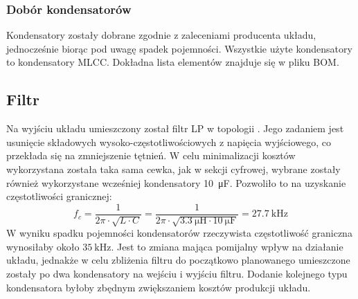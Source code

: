 \documentclass{article}
\begin{document}
\subsubsection{Dobór kondensatorów}
Kondensatory zostały dobrane zgodnie z zaleceniami producenta układu, jednocześnie biorąc pod uwagę spadek pojemności. Wszystkie użyte kondensatory to kondensatory MLCC. Dokładna lista elementów znajduje się w pliku BOM.

\subsection{Filtr}
Na wyjściu układu umieszczony został filtr LP w topologii \Pi. Jego zadaniem jest usunięcie składowych wysoko-częstotliwościowych z napięcia wyjściowego, co przekłada się na zmniejszenie tętnień. W celu minimalizacji kosztów wykorzystana została taka sama cewka, jak w sekcji cyfrowej, wybrane zostały również wykorzystane wcześniej kondensatory \SI{10}{\micro\farad}. Pozwoliło to na uzyskanie częstotliwości granicznej: $$f_c = \frac{1}{2\pi \cdot \sqrt{L \cdot C}} = \frac{1}{2\pi \cdot \sqrt{\SI{3.3}{\micro\henry} \cdot \SI{10}{\micro\farad}}} = \SI{27.7}{\kilo\hertz}$$
W wyniku spadku pojemności kondensatorów rzeczywista częstotliwość graniczna wynosiłaby około $\SI{35}{\kilo\hertz}$. Jest to zmiana mająca pomijalny wpływ na działanie układu, jednakże w celu zbliżenia filtru do początkowo planowanego umieszczone zostały po dwa kondensatory na wejściu i wyjściu filtru. Dodanie kolejnego typu kondensatora byłoby zbędnym zwiększaniem kosztów produkcji układu.
\end{document}
